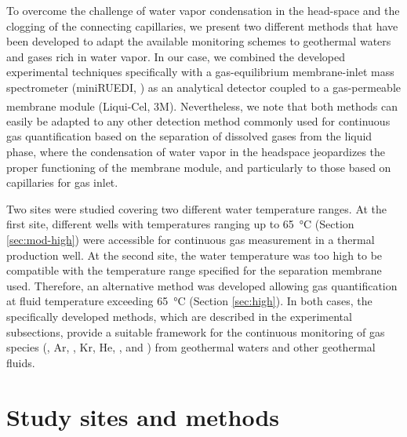To overcome the challenge of water vapor condensation in the head-space and the clogging of the connecting capillaries, we present two different methods that have been developed to adapt the available monitoring schemes to geothermal waters and gases rich in water vapor.
In our case, we combined the developed experimental techniques specifically with a gas-equilibrium membrane-inlet mass spectrometer (miniRUEDI, \cite{brennwald2016portable}) as an analytical detector coupled to a gas-permeable membrane module (Liqui-Cel\textsuperscript{\tiny\texttrademark}, 3M\textsuperscript{\tiny\texttrademark}).
Nevertheless, we note that both methods can easily be adapted to any other detection method commonly used for continuous gas quantification based on the separation of dissolved gases from the liquid phase, where the condensation of water vapor in the headspace jeopardizes the proper functioning of the membrane module, and particularly to those based on capillaries for gas inlet.

Two sites were studied covering two different water temperature ranges. 
At the first site, different wells with temperatures ranging up to \SI{65}{\celsius} (Section \ref{sec:mod-high}) were accessible for continuous gas measurement in a thermal production well. 
At the second site, the water temperature was too high to be compatible with the temperature range specified for the separation membrane used.
Therefore, an alternative method was developed allowing gas quantification at fluid temperature exceeding \SI{65}{\celsius} (Section \ref{sec:high}).
In both cases, the specifically developed methods, which are described in the experimental subsections, provide a suitable framework for the continuous monitoring of gas species (, Ar, , Kr, He, ,  and ) from geothermal waters and other geothermal fluids.


\section{Study sites and methods}

